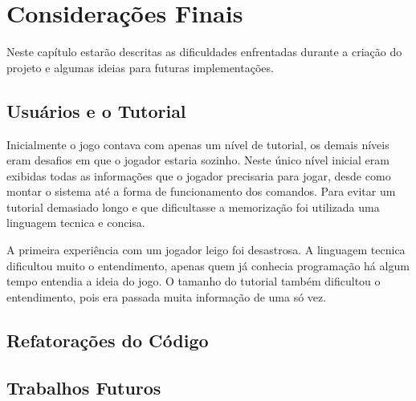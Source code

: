 \chapter{Considerações Finais}
\label{cap:Considerações Finais}

Neste capítulo estarão descritas as dificuldades enfrentadas durante a criação 
do projeto e algumas ideias para futuras implementações.

\section{Usuários e o Tutorial}

Inicialmente o jogo contava com apenas um nível de tutorial, os demais níveis 
eram desafios em que o jogador estaria sozinho. Neste único nível inicial eram
exibidas todas as informações que o jogador precisaria para jogar, desde como 
montar o sistema até a forma de funcionamento dos comandos. Para evitar um 
tutorial demasiado longo e que dificultasse a memorização foi utilizada uma 
linguagem tecnica e concisa.

A primeira experiência com um jogador leigo foi desastrosa. A linguagem tecnica 
dificultou muito o entendimento, apenas quem já conhecia programação há algum 
tempo entendia a ideia do jogo. O tamanho do tutorial também dificultou o 
entendimento, pois era passada muita informação de uma só vez.

\section{Refatorações do Código}

\section{Trabalhos Futuros}

